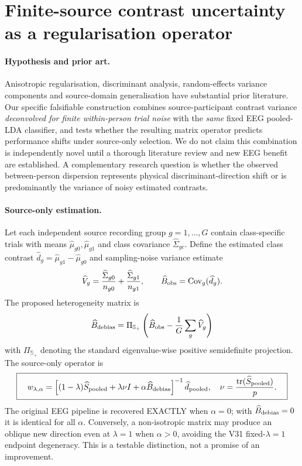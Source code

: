 \section{Finite-source contrast uncertainty as a regularisation operator}
\label{sec:v32-theory}
\paragraph{Hypothesis and prior art.}
Anisotropic regularisation, discriminant analysis, random-effects
variance components and source-domain generalisation have substantial
prior literature. Our specific falsifiable construction combines
source-participant contrast variance \emph{deconvolved for finite
within-person trial noise} with the \emph{same} fixed
EEG pooled-LDA classifier, and tests whether the resulting matrix
operator predicts performance shifts under source-only selection.
We do not claim this combination is independently novel until a
thorough literature review and new EEG benefit are established.
A complementary research question is whether the observed
between-person dispersion represents physical discriminant-direction
shift or is predominantly the variance of noisy estimated contrasts.

\paragraph{Source-only estimation.}
Let each independent source recording group $g=1,\dots,G$
contain class-specific trials with means
$\widehat\mu_{g0},\widehat\mu_{g1}$ and class covariance
$\widehat\Sigma_{gc}$. Define the estimated class contrast
$\widehat d_g=\widehat\mu_{g1}-\widehat\mu_{g0}$
and sampling-noise variance estimate
\[
  \widehat V_g=
  {\widehat\Sigma_{g0}\over n_{g0}}+
  {\widehat\Sigma_{g1}\over n_{g1}},\qquad
  \widehat B_{\rm obs}=\operatorname{Cov}_g(\widehat d_g).
\]
The proposed heterogeneity matrix is
\[
  \widehat B_{\rm debias}=
  \Pi_{\mathbb S_+}\left(
       \widehat B_{\rm obs}-{1\over G}\sum_g\widehat V_g
                       \right)
\]
with $\Pi_{\mathbb S_+}$ denoting the standard eigenvalue-wise
positive semidefinite projection. The source-only operator is
\[
 \boxed{\quad
 w_{\lambda,\alpha}=
  \left[(1-\lambda)\widehat S_{\rm pooled}
        +\lambda\nu I+\alpha\widehat B_{\rm debias}
  \right]^{-1}\widehat d_{\rm pooled},
 \quad \nu={\operatorname{tr}(\widehat S_{\rm pooled})\over p}.
 \quad}
\]
The original EEG pipeline is recovered EXACTLY when $\alpha=0$;
with $\widehat B_{\rm debias}=0$ it is identical for all $\alpha$.
Conversely, a non-isotropic matrix may produce an oblique
new direction even at $\lambda=1$ when $\alpha>0$,
avoiding the V31 fixed-$\lambda=1$ endpoint degeneracy.
This is a testable distinction, not a promise of an improvement.

